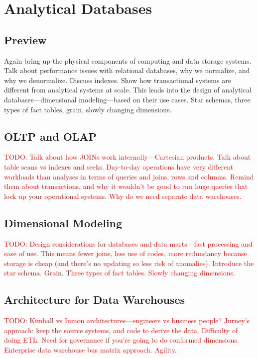\documentclass[11pt]{book}
\newcommand{\todo}[1]{\textcolor{red}{TODO: #1}} %
\begin{document}
\chapter{Analytical Databases}\label{ch:olap}

\section*{Preview}

Again bring up the physical components of computing and data storage systems.  Talk about performance issues with relational databases, why we normalize, and why we denormalize.  Discuss indexes.  Show how transactional systems are different from analytical systems at scale.  This leads into the design of analytical databases---dimensional modeling---based on their use cases.  Star schemas, three types of fact tables, grain, slowly changing dimensions.

\section{OLTP and OLAP}
\todo{Talk about how JOINs work internally---Cartesian products.  Talk about table scans vs indexes and seeks.  Day-to-day operations have very different workloads than analyses in terms of queries and joins, rows and columns.  Remind them about transactions, and why it wouldn't be good to run huge queries that lock up your operational systems.  Why do we need separate data warehouses.}

\section{Dimensional Modeling}
\todo{Design considerations for databases and data marts---fast processing and ease of use.  This means fewer joins, less use of codes, more redundancy because storage is cheap (and there's no updating so less risk of anomalies).  Introduce the star schema.  Grain.  Three types of fact tables.  Slowly changing dimensions.}

\section{Architecture for Data Warehouses}
\todo{Kimball vs Inmon architectures---engineers vs business people?  Jurney's approach: keep the source systems, and code to derive the data.  Difficulty of doing ETL.  Need for governance if you're going to do conformed dimensions.  Enterprise data warehouse bus matrix approach. Agility.}
\end{document}
